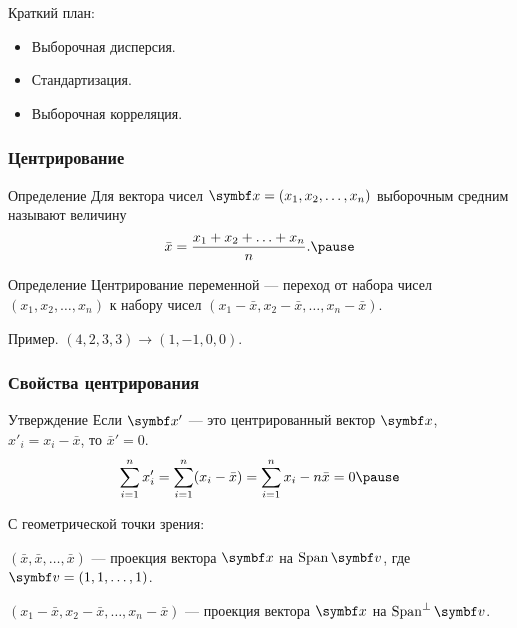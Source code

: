 
\begin{frame} %


\end{frame}



\begin{frame}{Краткий план:}
  \begin{itemize}[<+->]
    \item Выборочная дисперсия.
    \item Стандартизация.
    \item Выборочная корреляция.
  \end{itemize}

\end{frame}

\begin{frame}
  \frametitle{Центрирование}


  \begin{block}{Определение}
    Для вектора чисел $\bx = (x_1, x_2, \ldots, x_n)$ \alert{выборочным средним} называют величину
    \[
    \bar x = \frac{x_1 + x_2 + \ldots + x_n}{n}. \pause
    \]
  \end{block}

  \begin{block}{Определение}
    \alert{Центрирование переменной} — переход от набора чисел
    $(x_1, x_2, \ldots, x_n)$ к набору чисел $(x_1 - \bar x, x_2 - \bar x, \ldots, x_n - \bar x)$. \pause
  \end{block}

  Пример. $(4, 2, 3, 3) \to (1, -1, 0, 0)$.

\end{frame}


\begin{frame}
  \frametitle{Свойства центрирования}

  \begin{block}{Утверждение}
Если $\bx'$ — это центрированный вектор $\bx$, $x'_i = x_i - \bar x$, то 
$\bar x' = 0$. \pause
\[
\sum_{i=1}^n x'_i = \sum_{i=1}^n (x_i - \bar x) = \sum_{i=1}^n x_i - n\bar x =0  \pause
\]
  \end{block}

  С геометрической точки зрения:
  
  $(\bar x, \bar x, \ldots, \bar x)$ — проекция вектора $\bx$ на $\Span \bv$, где
  $\bv = (1, 1, \ldots, 1)$. \pause


$(x_1 - \bar x, x_2 - \bar x, \ldots, x_n - \bar x)$ — проекция вектора $\bx$ на $\Span^{\perp} \bv$.


\end{frame}



